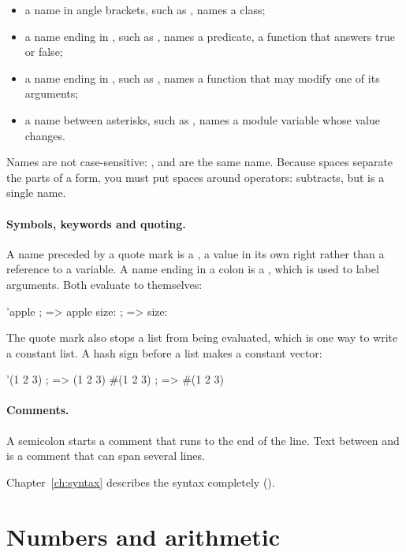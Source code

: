 \begin{itemize}
\item a name in angle brackets, such as , names a class;
\item a name ending in , such as , names a predicate,
  a function that answers true or false;
\item a name ending in \code{!}, such as , names a function
  that may modify one of its arguments;
\item a name between asterisks, such as , names a module
  variable whose value changes.
\end{itemize}

Names are not case-sensitive: ,  and  are the
same name. Because spaces separate the parts of a form, you must put
spaces around operators:  subtracts, but  is a
single name.

\paragraph{Symbols, keywords and quoting.} A name preceded by a quote
mark is a , a value in its own right rather than a reference
to a variable. A name ending in a colon is a , which is used
to label arguments. Both evaluate to themselves:

\begin{dylan}
'apple       ; => apple
size:        ; => size:
\end{dylan}

The quote mark also stops a list from being evaluated, which is one way to
write a constant list. A hash sign before a list makes a constant vector:

\begin{dylan}
'(1 2 3)     ; => (1 2 3)
#(1 2 3)     ; => #(1 2 3)
\end{dylan}

\paragraph{Comments.} A semicolon starts a comment that runs to the end of
the line. Text between \code{\#|} and \code{|\#} is a comment that can span
several lines.

\smallskip
Chapter~\ref{ch:syntax} describes the syntax completely ().

\section{Numbers and arithmetic}\label{sec:tut-numbers}

